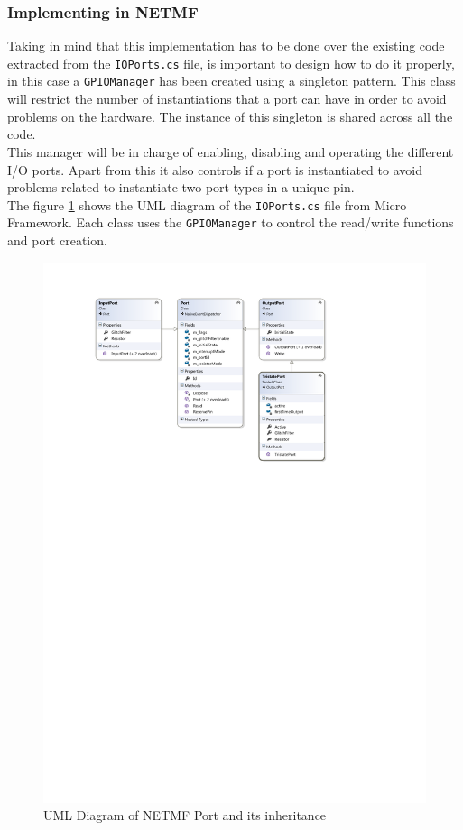\subsubsection{Implementing in NETMF}\label{SSS:Implementing-GPIO-NETMF}
Taking in mind that this implementation has to be done over the existing code extracted from the \verb!IOPorts.cs! file, is important to design how to do it properly, in this case a \verb!GPIOManager! has been created using a singleton pattern. This class will restrict the number of instantiations that a port can have in order to avoid problems on the hardware. The instance of this singleton is shared across all the code.
\\
This manager will be in charge of enabling, disabling and operating the different I/O ports. Apart from this it also controls if a port is instantiated to avoid problems related to instantiate two port types in a unique pin.
\\
The figure \ref{fig:gpio-uml} shows the UML diagram of the \verb!IOPorts.cs! file from Micro Framework. Each class uses the \verb!GPIOManager! to control the read/write functions and port creation.

\begin{figure}[H]\begin{center}
 \centering
  \captionsetup{justification=centering}
  \includegraphics[width=1\textwidth]{pictures/iosharp/gpio}
  \caption{UML Diagram of NETMF Port and its inheritance \label{fig:gpio-uml}}
\end{center}\end{figure}

